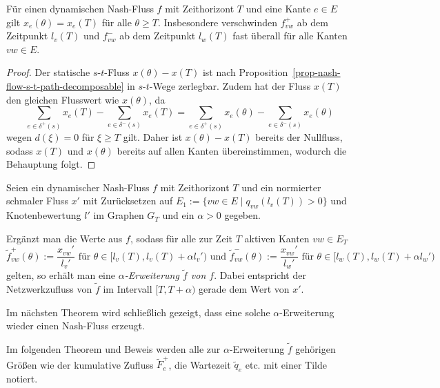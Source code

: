 \begin{proposition}
	Für einen dynamischen Nash-Fluss $f$ mit Zeithorizont $T$ und eine Kante $e\in E$ gilt $x_{e}(\theta) = x_{e}(T)$ für alle $\theta \geq T$.
	Insbesondere verschwinden $f_{vw}^+$ ab dem Zeitpunkt $l_v(T)$ und $f_{vw}^-$ ab dem Zeitpunkt $l_w(T)$ fast überall für alle Kanten $vw\in E$.
\end{proposition}
\begin{proof}
	Der statische $s$-$t$-Fluss $x(\theta) -x(T)$ ist nach Proposition~\ref{prop-nash-flow-s-t-path-decomposable} in $s$-$t$-Wege zerlegbar.
	Zudem hat der Fluss $x(T)$ den gleichen Flusswert wie $x(\theta)$, da
	\[ \sum_{e\in \delta^+(s)} x_e(T) - \sum_{e\in\delta^-(s)} x_e(T) = \sum_{e\in \delta^+(s)} x_e(\theta) - \sum_{e\in\delta^-(s)} x_e(\theta)\]
	wegen $d(\xi) = 0$ für $\xi \geq T $ gilt.
	Daher ist $x(\theta)- x(T)$ bereits der Nullfluss, sodass $x(T)$ und $x(\theta)$ bereits auf allen Kanten übereinstimmen, wodurch die Behauptung folgt.
\end{proof}

\begin{definition}
	Seien ein dynamischer Nash-Fluss $f$ mit Zeithorizont $T$ und ein normierter schmaler Fluss $x'$ mit Zurücksetzen auf $E_1 := \{ vw\in E \mid q_{vw}(l_v(T)) > 0 \} $ und Knotenbewertung $l'$ im Graphen $G_T$ und ein $\alpha > 0$ gegeben.
	
	Ergänzt man die Werte aus $f$, sodass für alle zur Zeit $T$ aktiven Kanten $vw\in E_T$
	\[ \tilde{f}_{vw}^+(\theta):= \frac{x_{vw}'}{l_v'} \text{ für $\theta\in [l_v(T), l_v(T)+\alpha l_v')$ und } \tilde{f}_{vw}^-(\theta):=\frac{x_{vw}'}{l_w'} \text{ für $\theta\in [l_w(T), l_w(T)+\alpha l_w')$} \]
	gelten, so erhält man eine \emph{$\alpha$-Erweiterung $\tilde{f}$ von $f$}.
	Dabei entspricht der Netzwerkzufluss von $\tilde{f}$ im Intervall $[T, T+\alpha)$ gerade dem Wert von $x'$.
\end{definition}

Im nächsten Theorem wird schließlich gezeigt, dass eine solche $\alpha$-Erweiterung wieder einen Nash-Fluss erzeugt.

\begin{notation}
	Im folgenden Theorem und Beweis werden alle zur $\alpha$-Erweiterung $\tilde{f}$ gehörigen Größen wie der kumulative Zufluss $\tilde{F}_e^+$, die Wartezeit $\tilde{q}_e$ etc. mit einer Tilde notiert.
\end{notation}

